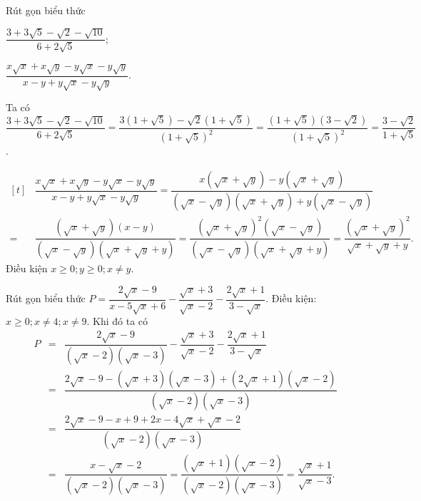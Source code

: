 \begin{bt}%
	Rút gọn biểu thức
	\begin{listEX}[2]
	\item $\dfrac{3 + 3\sqrt{5} - \sqrt{2} - \sqrt{10}}{6 + 2\sqrt{5}}$; 
	\item $\dfrac{x\sqrt{x} + x\sqrt{y} - y\sqrt{x} - y\sqrt{y}}{x - y + y\sqrt{x} - y\sqrt{y}}$.
	\end{listEX}
	\loigiai
	{
\begin{listEX}
	\item Ta có $\dfrac{3 + 3\sqrt{5} - \sqrt{2} - \sqrt{10}}{6 + 2\sqrt{5}}=\dfrac{3(1 + \sqrt{5}) - \sqrt{2}(1 + \sqrt{5})}{(1 + \sqrt{5})^2}=\dfrac{(1 + \sqrt{5})(3 - \sqrt{2})}{(1 + \sqrt{5})^2}=\dfrac{3 - \sqrt{2}}{1 + \sqrt{5}}$.
	\item 
	\allowdisplaybreaks $\begin{aligned}[t]
	&\dfrac{x\sqrt{x} + x\sqrt{y} - y\sqrt{x} - y\sqrt{y}}{x - y + y\sqrt{x} - y\sqrt{y}}=\dfrac{x(\sqrt{x} + \sqrt{y}) - y(\sqrt{x} + \sqrt{y})}{(\sqrt{x} - \sqrt{y})(\sqrt{x} + \sqrt{y}) + y(\sqrt{x} - \sqrt{y})}\\
	=&\dfrac{(\sqrt{x} + \sqrt{y})(x - y)}{(\sqrt{x} - \sqrt{y})(\sqrt{x} + \sqrt{y} + y)}=\dfrac{(\sqrt{x} + \sqrt{y})^2(\sqrt{x} - \sqrt{y})}{(\sqrt{x} - \sqrt{y})(\sqrt{x} + \sqrt{y} + y)}=\dfrac{(\sqrt{x} + \sqrt{y})^2}{\sqrt{x} + \sqrt{y} + y}.
	\end{aligned}$\\
	Điều kiện $x\geq 0 ; y\geq 0 ; x\neq y$.
\end{listEX}
	}
\end{bt}
\begin{bt}%
Rút gọn biểu thức $P=\dfrac{2\sqrt{x} - 9}{x - 5\sqrt{x} + 6} - \dfrac{\sqrt{x} + 3}{\sqrt{x} - 2} - \dfrac{2\sqrt{x} + 1}{3 - \sqrt{x}}$.
	\loigiai
	{
	Điều kiện: $x\geq 0 ; x\neq 4 ; x\neq 9$. Khi đó ta có 
	\allowdisplaybreaks 
	\begin{eqnarray*}
	P&=&\dfrac{2\sqrt{x} - 9}{(\sqrt{x} - 2)(\sqrt{x} - 3)} - \dfrac{\sqrt{x} + 3}{\sqrt{x} - 2} - \dfrac{2\sqrt{x} + 1}{3 - \sqrt{x}}\\
	&=&\dfrac{2\sqrt{x} - 9 - (\sqrt{x} + 3)(\sqrt{x} - 3) + (2\sqrt{x} + 1)(\sqrt{x} - 2)}{(\sqrt{x} - 2)(\sqrt{x} - 3)}\\
	&=&\dfrac{2\sqrt{x} - 9 - x + 9 + 2x - 4\sqrt{x} + \sqrt{x} - 2}{(\sqrt{x} - 2)(\sqrt{x} - 3)}\\
	&=&\dfrac{x - \sqrt{x} - 2}{(\sqrt{x} - 2)(\sqrt{x} - 3)}=\dfrac{(\sqrt{x} + 1)(\sqrt{x} - 2)}{(\sqrt{x} - 2)(\sqrt{x} - 3)}=\dfrac{\sqrt{x} + 1}{\sqrt{x} - 3}.
	\end{eqnarray*}
	}
\end{bt}
